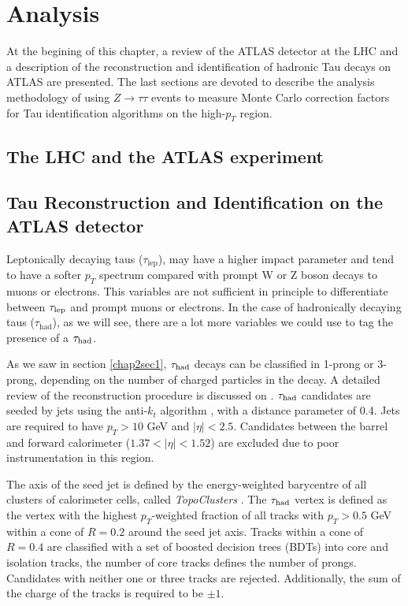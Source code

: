 \chapter{Analysis}\label{chap1}
At the begining of this chapter, a review of the ATLAS detector at the LHC and a description of the reconstruction and identification of hadronic Tau decays on ATLAS are presented. The last sections are devoted to describe the analysis methodology of using $Z\to\tau\tau$ events to measure Monte Carlo correction factors for Tau identification algorithms on the high-$p_T$ region.

\section{The LHC and the ATLAS experiment}

\section{Tau Reconstruction and Identification on the ATLAS detector}
Leptonically decaying taus ($\tau_\text{lep}$), may have a higher impact parameter and tend to have a softer $p_T$ spectrum compared with prompt W or Z boson decays to muons or electrons. This variables are not sufficient in principle to differentiate between $\tau_\text{lep}$ and prompt muons or electrons. In the case of hadronically decaying taus ($\tau_\text{had}$), as we will see, there are a lot more variables we could use to tag the presence of a $\tau_\text{had}$.

As we saw in section \ref{chap2sec1}, $\tau_\text{had}$ decays can be classified in 1-prong or 3-prong, depending on the number of charged particles in the decay. A detailed review of the reconstruction procedure is discussed on \cite{Aad:2014rga}. $\tau_\text{had}$ candidates are seeded by jets using the anti-$k_t$ algorithm \cite{Cacciari:2008gp}, with a distance parameter of 0.4. Jets are required to have $p_T>10$ GeV and $|\eta|<2.5$. Candidates between the barrel and forward calorimeter ($1.37<|\eta|<1.52$) are excluded due to poor instrumentation in this region.

The axis of the seed jet is defined by the energy-weighted barycentre of all clusters of calorimeter cells, called \textit{TopoClusters} \cite{Aad:2016upy}. The $\tau_\text{had}$ vertex is defined as the vertex with the highest $p_T$-weighted fraction of all tracks with $p_T>0.5$ GeV within a cone of $R=0.2$ around the seed jet axis. Tracks within a cone of $R=0.4$ are classified with a set of boosted decision trees (BDTs) into core and isolation tracks, the number of core tracks defines the number of prongs. Candidates with neither one or three tracks are rejected. Additionally, the sum of the charge of the tracks is required to be $\pm 1$.     

